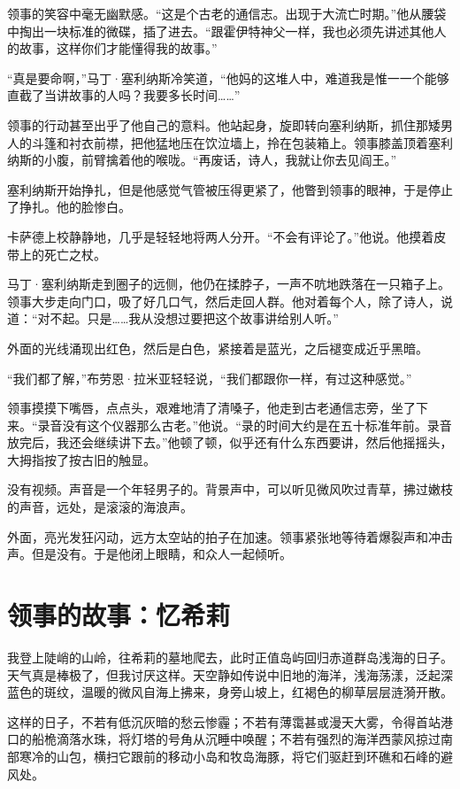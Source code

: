 \documentclass[AutoFakeBold=true]{book}
\begin{document}
领事的笑容中毫无幽默感。``这是个古老的通信志。出现于大流亡时期。''他从腰袋中掏出一块标准的微碟，插了进去。``跟霍伊特神父一样，我也必须先讲述其他人的故事，这样你们才能懂得我的故事。''

``真是要命啊，''马丁·塞利纳斯冷笑道，``他妈的这堆人中，难道我是惟一一个能够直截了当讲故事的人吗？我要多长时间……''

领事的行动甚至出乎了他自己的意料。他站起身，旋即转向塞利纳斯，抓住那矮男人的斗篷和衬衣前襟，把他猛地压在饮泣墙上，拎在包装箱上。领事膝盖顶着塞利纳斯的小腹，前臂擒着他的喉咙。``再废话，诗人，我就让你去见阎王。''

塞利纳斯开始挣扎，但是他感觉气管被压得更紧了，他瞥到领事的眼神，于是停止了挣扎。他的脸惨白。

卡萨德上校静静地，几乎是轻轻地将两人分开。``不会有评论了。''他说。他摸着皮带上的死亡之杖。

马丁·塞利纳斯走到圈子的远侧，他仍在揉脖子，一声不吭地跌落在一只箱子上。领事大步走向门口，吸了好几口气，然后走回人群。他对着每个人，除了诗人，说道：``对不起。只是……我从没想过要把这个故事讲给别人听。''

外面的光线涌现出红色，然后是白色，紧接着是蓝光，之后褪变成近乎黑暗。

``我们都了解，''布劳恩·拉米亚轻轻说，``我们都跟你一样，有过这种感觉。''

领事摸摸下嘴唇，点点头，艰难地清了清嗓子，他走到古老通信志旁，坐了下来。``录音没有这个仪器那么古老。''他说。``录的时间大约是在五十标准年前。录音放完后，我还会继续讲下去。''他顿了顿，似乎还有什么东西要讲，然后他摇摇头，大拇指按了按古旧的触显。

没有视频。声音是一个年轻男子的。背景声中，可以听见微风吹过青草，拂过嫩枝的声音，远处，是滚滚的海浪声。

外面，亮光发狂闪动，远方太空站的拍子在加速。领事紧张地等待着爆裂声和冲击声。但是没有。于是他闭上眼睛，和众人一起倾听。

\section{领事的故事：忆希莉}

我登上陡峭的山岭，往希莉的墓地爬去，此时正值岛屿回归赤道群岛浅海的日子。天气真是棒极了，但我讨厌这样。天空静如传说中旧地的海洋，浅海荡漾，泛起深蓝色的斑纹，温暖的微风自海上拂来，身旁山坡上，红褐色的柳草层层涟漪开散。

这样的日子，不若有低沉灰暗的愁云惨霾；不若有薄霭甚或漫天大雾，令得首站港口的船桅滴落水珠，将灯塔的号角从沉睡中唤醒；不若有强烈的海洋西蒙风掠过南部寒冷的山包，横扫它跟前的移动小岛和牧岛海豚，将它们驱赶到环礁和石峰的避风处。
\end{document}
